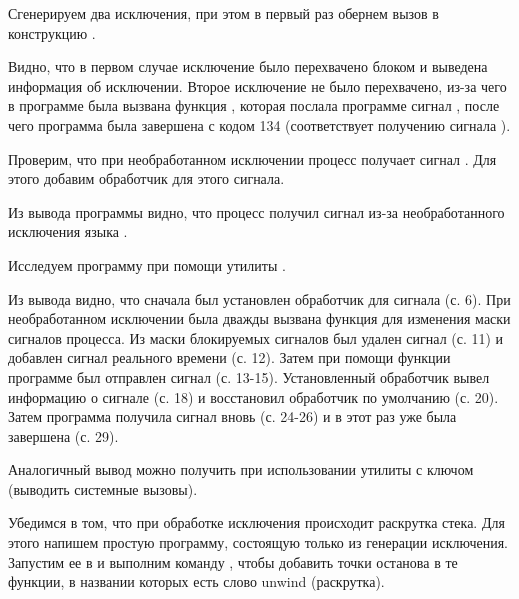 Сгенерируем два исключения, при этом в первый раз обернем вызов  в конструкцию .


Видно, что в первом случае исключение было перехвачено блоком  и выведена информация об исключении. Второе исключение не было перехвачено, из-за чего в программе была вызвана функция , которая послала программе сигнал , после чего программа была завершена с кодом 134 (соответствует получению сигнала ).

Проверим, что при необработанном исключении процесс получает сигнал . Для этого добавим обработчик для этого сигнала.


Из вывода программы видно, что процесс получил сигнал  из-за необработанного исключения языка .

Исследуем программу  при помощи утилиты .


Из вывода видно, что сначала был установлен обработчик для сигнала  (с. 6). При необработанном исключении была дважды вызвана функция  для изменения маски сигналов процесса. Из маски блокируемых сигналов был удален сигнал  (с. 11) и добавлен сигнал реального времени (с. 12). Затем при помощи функции  программе был отправлен сигнал  (с. 13-15). Установленный обработчик вывел информацию о сигнале (с. 18) и восстановил обработчик по умолчанию (с. 20). Затем программа получила сигнал  вновь (с. 24-26) и в этот раз уже была завершена (с. 29).

Аналогичный вывод можно получить при использовании утилиты  с ключом  (выводить системные вызовы).


Убедимся в том, что при обработке исключения происходит раскрутка стека. Для этого напишем простую программу, состоящую только из генерации исключения. Запустим ее в  и выполним команду , чтобы добавить точки останова в те функции, в названии которых есть слово unwind (раскрутка).



